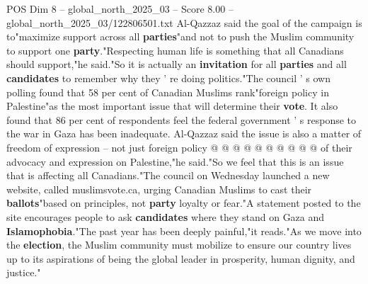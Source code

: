 \begin{textsample}{POS Dim 8 – global\_north\_2025\_03 – Score 8.00 – global\_north\_2025\_03/122806501.txt}
Al-Qazzaz said the goal of the campaign is to"maximize support across all \textbf{parties}"and not to push the Muslim community to support one \textbf{party}."Respecting human life is something that all Canadians should support,"he said."So it is actually an \textbf{invitation} for all \textbf{parties} and all \textbf{candidates} to remember why they ' re doing politics."The council ' s own polling found that 58 per cent of Canadian Muslims rank"foreign policy in Palestine"as the most important issue that will determine their \textbf{vote}.
It also found that 86 per cent of respondents feel the federal government ' s response to the war in Gaza has been inadequate.
Al-Qazzaz said the issue is also a matter of freedom of expression -- not just foreign policy @ @ @ @ @ @ @ @ @ @ of their advocacy and expression on Palestine,"he said."So we feel that this is an issue that is affecting all Canadians."The council on Wednesday launched a new website, called muslimsvote.ca, urging Canadian Muslims to cast their \textbf{ballots}"based on principles, not \textbf{party} loyalty or fear."A statement posted to the site encourages people to ask \textbf{candidates} where they stand on Gaza and \textbf{Islamophobia}."The past year has been deeply painful,"it reads."As we move into the \textbf{election}, the Muslim community must mobilize to ensure our country lives up to its aspirations of being the global leader in prosperity, human dignity, and justice."

\end{textsample}
